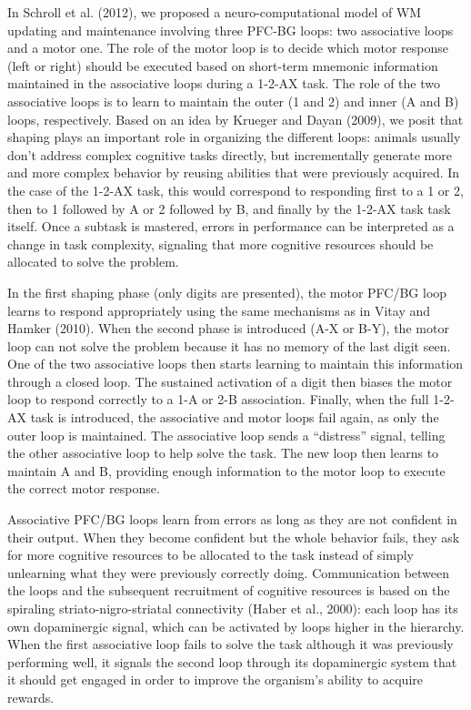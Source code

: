 \documentclass[
  11pt,
  a4paper,
]{scrbook}
\begin{document}
In Schroll et al. (2012), we proposed a neuro-computational model of WM
updating and maintenance involving three PFC-BG loops: two associative
loops and a motor one. The role of the motor loop is to decide which
motor response (left or right) should be executed based on short-term
mnemonic information maintained in the associative loops during a 1-2-AX
task. The role of the two associative loops is to learn to maintain the
outer (1 and 2) and inner (A and B) loops, respectively. Based on an
idea by Krueger and Dayan (2009), we posit that shaping plays an
important role in organizing the different loops: animals usually don't
address complex cognitive tasks directly, but incrementally generate
more and more complex behavior by reusing abilities that were previously
acquired. In the case of the 1-2-AX task, this would correspond to
responding first to a 1 or 2, then to 1 followed by A or 2 followed by
B, and finally by the 1-2-AX task task itself. Once a subtask is
mastered, errors in performance can be interpreted as a change in task
complexity, signaling that more cognitive resources should be allocated
to solve the problem.

In the first shaping phase (only digits are presented), the motor PFC/BG
loop learns to respond appropriately using the same mechanisms as in
Vitay and Hamker (2010). When the second phase is introduced (A-X or
B-Y), the motor loop can not solve the problem because it has no memory
of the last digit seen. One of the two associative loops then starts
learning to maintain this information through a closed loop. The
sustained activation of a digit then biases the motor loop to respond
correctly to a 1-A or 2-B association. Finally, when the full 1-2-AX
task is introduced, the associative and motor loops fail again, as only
the outer loop is maintained. The associative loop sends a ``distress''
signal, telling the other associative loop to help solve the task. The
new loop then learns to maintain A and B, providing enough information
to the motor loop to execute the correct motor response.

Associative PFC/BG loops learn from errors as long as they are not
confident in their output. When they become confident but the whole
behavior fails, they ask for more cognitive resources to be allocated to
the task instead of simply unlearning what they were previously
correctly doing. Communication between the loops and the subsequent
recruitment of cognitive resources is based on the spiraling
striato-nigro-striatal connectivity (Haber et al., 2000): each loop has
its own dopaminergic signal, which can be activated by loops higher in
the hierarchy. When the first associative loop fails to solve the task
although it was previously performing well, it signals the second loop
through its dopaminergic system that it should get engaged in order to
improve the organism's ability to acquire rewards.
\end{document}
